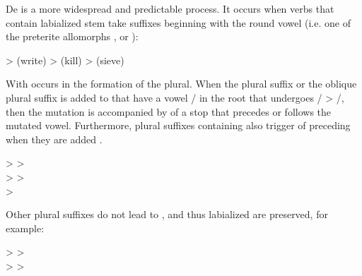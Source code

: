 De is a more widespread and predictable process. It occurs when verbs that contain labialized stem  take suffixes beginning with the round vowel  (i.e. one of the preterite allomorphs ,  or ):
%
\begin{exe}
	\ex	\label{ex:delabialization A phon}
	\begin{xlist}
		\ex	{}  >   (write)
		\ex	{}  >   (kill)
		\ex	{}  >   (sieve)
	\end{xlist}
\end{exe}

With   occurs in the formation of the plural. When the plural suffix or the oblique plural suffix is added to  that have a vowel \slash{} in the root that undergoes  \slash{} > \slash{}, then the mutation is accompanied by  of a stop that precedes or follows the mutated vowel. Furthermore, plural suffixes containing  also trigger  of preceding  when they are added .
%
\begin{exe}
	\ex	\label{ex:plural delabialization phon}
\TabPositions{13em}
		  >  \tab 	{}  >  \\
		  > 	\tab 	{}  >  \\
		  > 
\end{exe}

Other plural suffixes do not lead to , and thus labialized  are preserved, for example:
%
\begin{exe}
	\ex	\label{ex:no plural vowel mutation phon}
\TabPositions{13em}
		  > 	\tab 	{}  >  \\
		  > 	\tab 	{}  >  
\end{exe}



